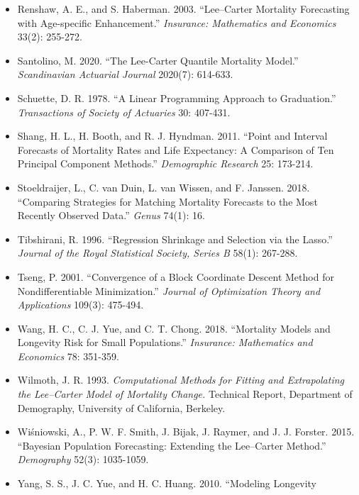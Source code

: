 \documentclass[UTF8, fontset=macnew, a4paper, 12pt]{ctexart}
\begin{document}
\begin{itemize}[leftmargin=2em, label={}, itemsep=3pt]
        the Lee--Carter Method: Adjusting for Smoothing and Lifespan
        Disparity.'' \textit{European Journal of Population} 37(1): 97-120.
  \item[] Renshaw, A. E., and S. Haberman. 2003. ``Lee--Carter Mortality
        Forecasting with Age-specific Enhancement.''
        \textit{Insurance: Mathematics and Economics} 33(2): 255-272.
  \item[] Santolino, M. 2020. ``The Lee-Carter Quantile Mortality Model.''
        \textit{Scandinavian Actuarial Journal} 2020(7): 614-633.
  \item[] Schuette, D. R. 1978. ``A Linear Programming Approach to
        Graduation.'' \textit{Transactions of Society of Actuaries}
        30: 407-431.
  \item[] Shang, H. L., H. Booth, and R. J. Hyndman. 2011. ``Point and Interval
        Forecasts of Mortality Rates and Life Expectancy: A Comparison of Ten
        Principal Component Methods.''
        \textit{Demographic Research} 25: 173-214.
  \item[] Stoeldraijer, L., C. van Duin, L. van Wissen, and F. Janssen. 2018.
        ``Comparing Strategies for Matching Mortality Forecasts to the Most
        Recently Observed Data.'' \textit{Genus} 74(1): 16.
  \item[] Tibshirani, R. 1996. ``Regression Shrinkage and Selection via the
        Lasso.'' \textit{Journal of the Royal Statistical Society, Series B}
        58(1): 267-288.
  \item[] Tseng, P. 2001. ``Convergence of a Block Coordinate Descent Method
        for Nondifferentiable Minimization.'' \textit{Journal of Optimization
        Theory and Applications} 109(3): 475-494.
  \item[] Wang, H. C., C. J. Yue, and C. T. Chong. 2018. ``Mortality Models and
        Longevity Risk for Small Populations.''
        \textit{Insurance: Mathematics and Economics} 78: 351-359.
  \item[] Wilmoth, J. R. 1993. \textit{Computational Methods for Fitting and
        Extrapolating the Lee--Carter Model of Mortality Change.} Technical
        Report, Department of Demography, University of California, Berkeley.
  \item[] Wi\'sniowski, A., P. W. F. Smith, J. Bijak, J. Raymer, and
        J. J. Forster. 2015. ``Bayesian Population Forecasting: Extending the
        Lee--Carter Method.'' \textit{Demography} 52(3): 1035-1059.
  \item[] Yang, S. S., J. C. Yue, and H. C. Huang. 2010. ``Modeling Longevity

\end{itemize}
\end{document}
